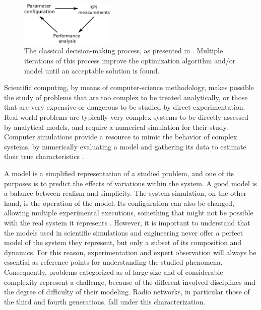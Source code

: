 \begin{figure}
\centering

\includegraphics[width=0.4\textwidth]{02-background_and_motivation/img/optimization_cycle}

\caption{The classical decision-making process, as presented in \cite{Talbi_Metaheuristics:2009}.
Multiple iterations of this process improve the optimization algorithm
and/or model until an acceptable solution is found. \label{fig:01-decision_making_process}}
\end{figure}


\bigskip{}


Scientific computing, by means of computer-science methodology, makes
possible the study of problems that are too complex to be treated
analytically, or those that are very expensive or dangerous to be
studied by direct experimentation. Real-world problems are typically
very complex systems to be directly assessed by analytical models,
and require a numerical simulation for their study. Computer simulations
provide a resource to mimic the behavior of complex systems, by numerically
evaluating a model and gathering its data to estimate their true characteristics
\cite{law2007simulation}.

A model is a simplified representation of a studied problem, and one
of its purposes is to predict the effects of variations within the
system. A good model is a balance between realism and simplicity.
The system simulation, on the other hand, is the operation of the
model. Its configuration can also be changed, allowing multiple experimental
executions, something that might not be possible with the real system
it represents \cite{maria1997introduction}. However, it is important
to understand that the models used in scientific simulations and engineering
never offer a perfect model of the system they represent, but only
a subset of its composition and dynamics. For this reason, experimentation
and expert observation will always be essential as reference points
for understanding the studied phenomena. Consequently, problems categorized
as of large size and of considerable complexity represent a challenge,
because of the different involved disciplines and the degree of difficulty
of their modeling. Radio networks, in particular those of the third
and fourth generations, fall under this characterization.

